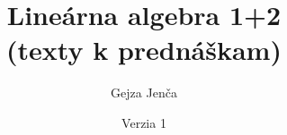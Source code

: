 \documentclass[11pt,a4paper]{article}
\theoremstyle{definition}
\theoremstyle{plain}
\theoremstyle{remark}
\begin{document}
\title{Lineárna algebra 1+2\\(texty k prednáškam)}
\author{Gejza Jenča}
\date{Verzia 1}
\maketitle
\tableofcontents
















\end{document}
